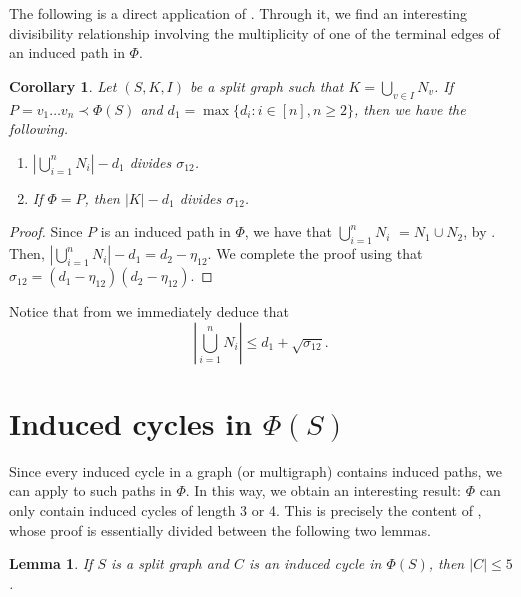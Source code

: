 \documentclass[11pt]{elsarticle}
\newtheorem{corollary}[corollary]{Corollary}
\newtheorem{lemma}[lemma]{Lemma}
\begin{document}
The following is a direct application of . Through it, we find an interesting divisibility relationship involving the multiplicity of one of the terminal edges of an induced path in $\Phi$. 

\begin{corollary}
	\label{K-d_max.divide.sigma}
	Let $(S,K,I)$ be a split graph such that $K=\bigcup_{v\in I}N_v$. If 
	$P=v_1\ldots v_n\prec\Phi(S)$ and $d_1=\max\{d_i:i\in[n],n\geq 2\}$, then we have the following.
	\begin{enumerate}
		\item $|\bigcup_{i=1}^n N_i|-d_1$ divides $\sigma_{12}$.
		
		\item If $\Phi=P$, then $|K|-d_1$ divides $\sigma_{12}$.
	\end{enumerate}
\end{corollary}

\begin{proof}
	Since $P$ is an induced path in $\Phi$, we have that $\bigcup_{i=1}^n N_i$ $=N_1\cup N_2$, by . Then, $|\bigcup_{i=1}^n N_i|-d_1=d_2-\eta_{12}$. We complete the proof using that $\sigma_{12}=(d_1-\eta_{12})(d_2-\eta_{12})$.
\end{proof}

Notice that from  we immediately deduce that 
\[ \left|\bigcup_{i=1}^n N_i \right|\leq d_1+\sqrt{\sigma_{12}}. \] 


\section{Induced cycles in $\Phi(S)$}
\label{sec:ind_cycles_Phi}

Since every induced cycle in a graph (or multigraph) contains induced paths, we can apply  to such paths in $\Phi$. In this way, we obtain an interesting result: $\Phi$ can only contain induced cycles of length 3 or 4. This is precisely the content of , whose proof is essentially divided between the following two lemmas. 

\begin{lemma}
	\label{no.hay.C_5.en.Phi.con.|C|<6}
	If $S$ is a split graph and $C$ is an induced cycle in $\Phi(S)$, then $|C|\leq 5$.
\end{lemma}
\end{document}
